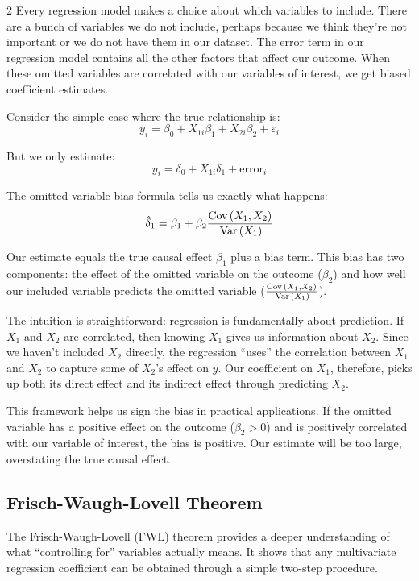 \documentclass[12pt]{article}
\begin{document}
\begin{multicols}{2}
Every regression model makes a choice about which variables to include.
There are a bunch of variables we do not include, perhaps because we think they're not important or we do not have them in our dataset.
The error term in our regression model contains all the other factors that affect our outcome.
When these omitted variables are correlated with our variables of interest, we get biased coefficient estimates.

Consider the simple case where the true relationship is:
$$y_i = \beta_0 + X_{1i}\beta_1 + X_{2i}\beta_2 + \varepsilon_i$$

But we only estimate:
$$y_i = \delta_0 + X_{1i}\delta_1 + \text{error}_i$$

The omitted variable bias formula tells us exactly what happens:
$$\hat{\delta}_1 = \beta_1 + \beta_2 \frac{\cov{X_1, X_2}}{\var{X_1}}$$

Our estimate equals the true causal effect $\beta_1$ plus a bias term.
This bias has two components: the effect of the omitted variable on the outcome ($\beta_2$) and how well our included variable predicts the omitted variable ($\frac{\cov{X_1, X_2}}{\var{X_1}}$).

The intuition is straightforward: regression is fundamentally about prediction.
If $X_1$ and $X_2$ are correlated, then knowing $X_1$ gives us information about $X_2$.
Since we haven't included $X_2$ directly, the regression ``uses'' the correlation between $X_1$ and $X_2$ to capture some of $X_2$'s effect on $y$.
Our coefficient on $X_1$, therefore, picks up both its direct effect and its indirect effect through predicting $X_2$.

This framework helps us sign the bias in practical applications.
If the omitted variable has a positive effect on the outcome ($\beta_2 > 0$) and is positively correlated with our variable of interest, the bias is positive.
Our estimate will be too large, overstating the true causal effect.

\subsection*{Frisch-Waugh-Lovell Theorem}


The Frisch-Waugh-Lovell (FWL) theorem provides a deeper understanding of what ``controlling for'' variables actually means.
It shows that any multivariate regression coefficient can be obtained through a simple two-step procedure.


\end{multicols}
\end{document}
